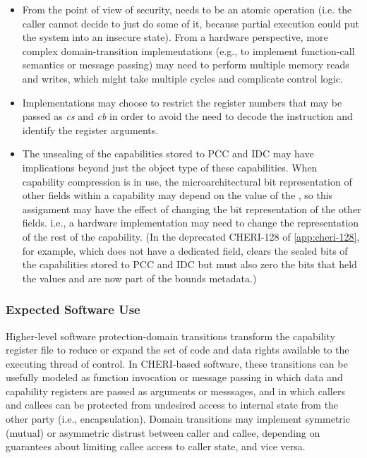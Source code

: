 \begin{itemize}
\item
From the point of view of security,  needs to be an atomic
operation (i.e.  the caller cannot decide to just do some of it, because
partial execution could put the system
into an insecure state).
From a hardware perspective, more complex domain-transition implementations
(e.g., to implement function-call semantics or message passing) may need to
perform multiple memory reads and writes, which might take multiple cycles and
complicate control logic.

\item
Implementations may choose to restrict the register numbers that may be passed as \emph{cs} and \emph{cb} in order to avoid the need to decode the instruction and identify the register arguments.

\item
The unsealing of the capabilities stored to PCC and IDC may have implications
beyond just the object type of these capabilities.
When capability compression is in use, the
microarchitectural bit representation of other fields within a capability
may depend on the value of the \cotype{}, so this assignment may have the
effect of changing the bit representation of the other fields. i.e., a
hardware implementation may need to change the representation of the rest
of the capability.
(In the deprecated CHERI-128 of \cref{app:cheri-128},
for example, which does not have a dedicated \cotype{} field,
 clears the sealed bits of the capabilities
stored to PCC and IDC but must also zero
the bits that held the \cotype{} values
and are now part of the bounds metadata.)

\end{itemize}


\subsubsection*{Expected Software Use}

Higher-level software protection-domain transitions transform the capability
register file to reduce or expand the set of code and data rights available to
the executing thread of control.
In CHERI-based software, these transitions can be usefully modeled as function
invocation or message passing in which data and capability registers are
passed as arguments or messsages, and in which callers and callees can be
protected from undesired access to internal state from the other party (i.e.,
encapsulation).
Domain transitions may implement symmetric (mutual) or asymmetric distrust
between caller and callee, depending on guarantees about limiting callee
access to caller state, and vice versa.

